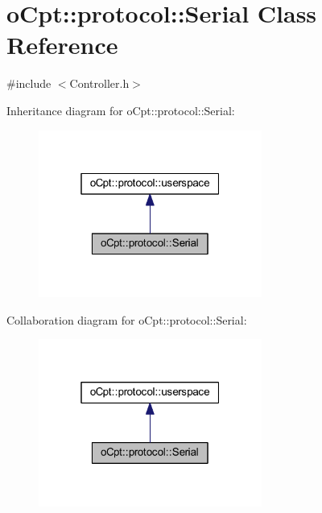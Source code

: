 \hypertarget{classo_cpt_1_1protocol_1_1_serial}{}\section{o\+Cpt\+:\+:protocol\+:\+:Serial Class Reference}
\label{classo_cpt_1_1protocol_1_1_serial}


{\ttfamily \#include $<$Controller.\+h$>$}



Inheritance diagram for o\+Cpt\+:\+:protocol\+:\+:Serial\+:
\nopagebreak
\begin{figure}[H]
\begin{center}
\leavevmode
\includegraphics[width=208pt]{classo_cpt_1_1protocol_1_1_serial__inherit__graph}
\end{center}
\end{figure}


Collaboration diagram for o\+Cpt\+:\+:protocol\+:\+:Serial\+:
\nopagebreak
\begin{figure}[H]
\begin{center}
\leavevmode
\includegraphics[width=208pt]{classo_cpt_1_1protocol_1_1_serial__coll__graph}
\end{center}
\end{figure}
